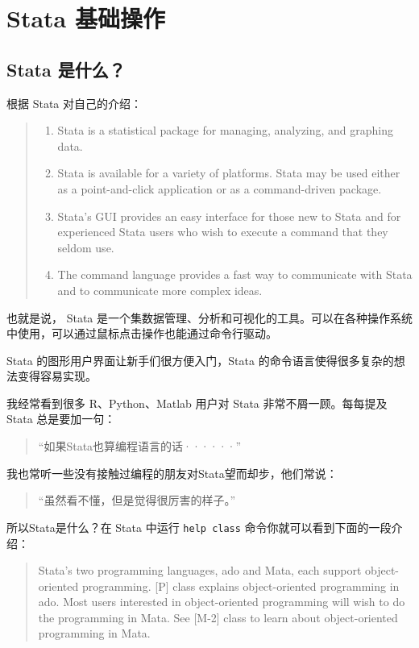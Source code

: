 \chapter{Stata 基础操作}
\section{Stata 是什么？}

根据 Stata 对自己的介绍：

\begin{quote}
\begin{enumerate}
\item  Stata is a statistical package for managing, analyzing, and graphing data.
\item  Stata is available for a variety of platforms. Stata may be used either as a point-and-click application or as a command-driven package.
\item  Stata's GUI provides an easy interface for those new to Stata and for experienced Stata users who  wish to execute a command that they seldom use.
\item  The command language provides a fast way to communicate with Stata and to communicate more complex ideas.
\end{enumerate}
\end{quote}

也就是说， Stata 是一个集数据管理、分析和可视化的工具。可以在各种操作系统中使用，可以通过鼠标点击操作也能通过命令行驱动。

Stata 的图形用户界面让新手们很方便入门，Stata 的命令语言使得很多复杂的想法变得容易实现。

我经常看到很多 R、Python、Matlab 用户对 Stata 非常不屑一顾。每每提及 Stata 总是要加一句：

\begin{quote}
``如果Stata也算编程语言的话······''
\end{quote}

我也常听一些没有接触过编程的朋友对Stata望而却步，他们常说：

\begin{quote}
``虽然看不懂，但是觉得很厉害的样子。''
\end{quote}

所以Stata是什么？在 Stata 中运行 \texttt{help\ class} 命令你就可以看到下面的一段介绍：

\begin{quote}
Stata's two programming languages, ado and Mata, each support object-oriented programming. {[}P{]} class explains object-oriented programming in ado. Most users interested in object-oriented programming will wish to do the programming in Mata. See {[}M-2{]} class to learn about object-oriented programming in Mata.
\end{quote}

